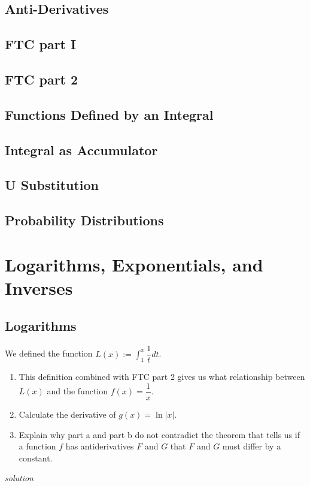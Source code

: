 \documentclass{amsbook}
\begin{document}
\section{Anti-Derivatives}

\section{FTC part I}

\section{FTC part 2}

\section{Functions Defined by an Integral}

\section{Integral as Accumulator}

\section{U Substitution}

\section{Probability Distributions}


\chapter{Logarithms, Exponentials, and Inverses}

\section{Logarithms}
\begin{Exercise}[title={A Better Antiderivative}, difficulty=0, label=7a2]
We defined the function $L(x):=\displaystyle \int_1^x \dfrac{1}{t}dt$.
	\begin{enumerate}
		\item This definition combined with FTC part 2 gives us what relationship between $L(x)$ and the function $f(x)=\dfrac{1}{x}$.\\
		\item Calculate the derivative of $g(x)=\ln|x|$.\\
		\item Explain why part a and part b do not contradict the theorem that tells us if a function $f$ has antiderivatives $F$ and $G$ that $F$ and $G$ must differ by a constant.\\
		
	\end{enumerate}
\hfill \emph{solution} 


\end{Exercise}
\end{document}
